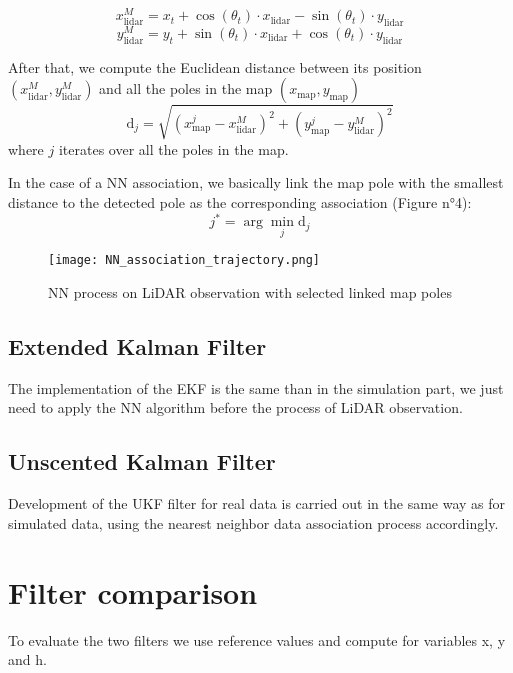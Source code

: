 \documentclass[conference]{IEEEtran}
\begin{document}
\[
x_{\text{lidar}}^{M} = x_t + \cos(\theta_t) \cdot x_{\text{lidar}} - \sin(\theta_t) \cdot y_{\text{lidar}}
\]
\[
y_{\text{lidar}}^{M} = y_t + \sin(\theta_t) \cdot x_{\text{lidar}} + \cos(\theta_t) \cdot y_{\text{lidar}}
\]

\noindent After that, we compute the Euclidean distance between its position \((x_{\text{lidar}}^{M}, y_{\text{lidar}}^{M})\) and all the poles in the map \((x_{\text{map}}, y_{\text{map}})\)
\[
\text{d}_{j} = \sqrt{(x_{\text{map}}^j - x_{\text{lidar}}^{M})^2 + (y_{\text{map}}^j - y_{\text{lidar}}^{M})^2}
\]
where \(j\) iterates over all the poles in the map.

\vspace{2mm}

\noindent In the case of a NN association, we basically link the map pole with the smallest distance to the detected pole as the corresponding association (Figure n°4):
\[
j^* = \arg\min_j \text{d}_j
\]

\begin{figure}[H]
    \centering
    \texttt{[image: NN\_association\_trajectory.png]}
    \caption{NN process on LiDAR observation with selected linked map poles}
    \label{fig:enter-label}
\end{figure}


\subsection{Extended Kalman Filter}

The implementation of the EKF is the same than in the simulation part, we just need to apply the NN algorithm before the process of LiDAR observation.

\subsection{Unscented Kalman Filter}

Development of the UKF filter for real data is carried out in the same way as for simulated data, using the nearest neighbor data association process accordingly.

\vspace{3mm}

\newpage

\section{Filter comparison}

To evaluate the two filters we use reference values and compute for variables x, y and h. 
\end{document}
